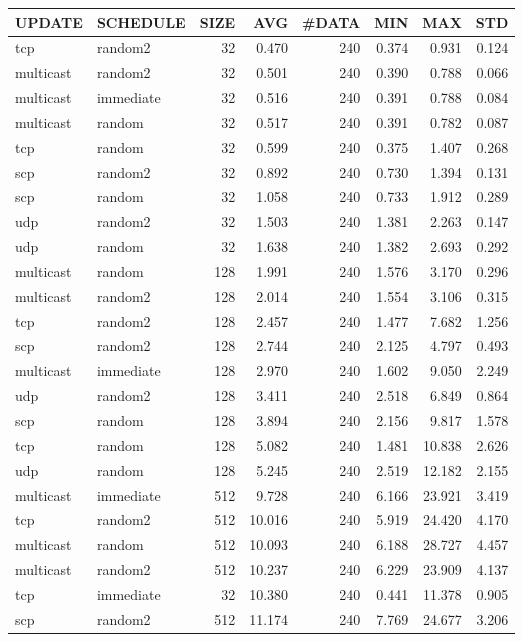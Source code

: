 \begin{tabular}{|l|l|r|r|r|r|r|r|}
\hline
UPDATE & SCHEDULE & SIZE & AVG & \#DATA & MIN & MAX & STD\\
\hline
tcp & random2 & 32 &  0.470 & 240 & 0.374 & 0.931 & 0.124\\
multicast & random2 & 32 &  0.501 & 240 & 0.390 & 0.788 & 0.066\\
multicast & immediate & 32 &  0.516 & 240 & 0.391 & 0.788 & 0.084\\
multicast & random & 32 &  0.517 & 240 & 0.391 & 0.782 & 0.087\\
tcp & random & 32 &  0.599 & 240 & 0.375 & 1.407 & 0.268\\
scp & random2 & 32 &  0.892 & 240 & 0.730 & 1.394 & 0.131\\
scp & random & 32 &  1.058 & 240 & 0.733 & 1.912 & 0.289\\
udp & random2 & 32 &  1.503 & 240 & 1.381 & 2.263 & 0.147\\
udp & random & 32 &  1.638 & 240 & 1.382 & 2.693 & 0.292\\
multicast & random & 128 &  1.991 & 240 & 1.576 & 3.170 & 0.296\\
multicast & random2 & 128 &  2.014 & 240 & 1.554 & 3.106 & 0.315\\
tcp & random2 & 128 &  2.457 & 240 & 1.477 & 7.682 & 1.256\\
scp & random2 & 128 &  2.744 & 240 & 2.125 & 4.797 & 0.493\\
multicast & immediate & 128 &  2.970 & 240 & 1.602 & 9.050 & 2.249\\
udp & random2 & 128 &  3.411 & 240 & 2.518 & 6.849 & 0.864\\
scp & random & 128 &  3.894 & 240 & 2.156 & 9.817 & 1.578\\
tcp & random & 128 &  5.082 & 240 & 1.481 & 10.838 & 2.626\\
udp & random & 128 &  5.245 & 240 & 2.519 & 12.182 & 2.155\\
multicast & immediate & 512 &  9.728 & 240 & 6.166 & 23.921 & 3.419\\
tcp & random2 & 512 &  10.016 & 240 & 5.919 & 24.420 & 4.170\\
multicast & random & 512 &  10.093 & 240 & 6.188 & 28.727 & 4.457\\
multicast & random2 & 512 &  10.237 & 240 & 6.229 & 23.909 & 4.137\\
tcp & immediate & 32 &  10.380 & 240 & 0.441 & 11.378 & 0.905\\
scp & random2 & 512 &  11.174 & 240 & 7.769 & 24.677 & 3.206\\

\end{tabular}
